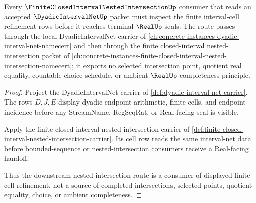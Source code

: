 \begin{theorem}
\label{thm:dyadic-interval-net-finite-closed-interval-nested-intersection-route}
Every $\FiniteClosedIntervalNestedIntersectionUp$ consumer that reads an accepted $\DyadicIntervalNetUp$ packet must inspect the finite interval-cell refinement rows before it reaches terminal $\RealUp$ seals. The route passes through the local DyadicIntervalNet carrier of \autoref{ch:concrete-instances-dyadic-interval-net-namecert} and then through the finite closed-interval nested-intersection packet of \autoref{ch:concrete-instances-finite-closed-interval-nested-intersection-namecert}; it exports no selected intersection point, quotient real equality, countable-choice schedule, or ambient $\RealUp$ completeness principle.
\end{theorem}
\begin{proof}
Project the DyadicIntervalNet carrier of \autoref{def:dyadic-interval-net-carrier}. The rows $D,J,E$ display dyadic endpoint arithmetic, finite cells, and endpoint incidence before any StreamName, RegSeqRat, or Real-facing seal is visible.

Apply the finite closed-interval nested-intersection carrier of \autoref{def:finite-closed-interval-nested-intersection-carrier}. Its cell row reads the same interval-net data before bounded-sequence or nested-intersection consumers receive a Real-facing handoff.

Thus the downstream nested-intersection route is a consumer of displayed finite cell refinement, not a source of completed intersections, selected points, quotient equality, choice, or ambient completeness.
\end{proof}
